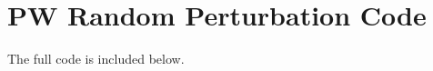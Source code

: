 \chapter{PW Random Perturbation Code}
\label{chapter:appendix-qeforfit}
 
The full code is included below.






